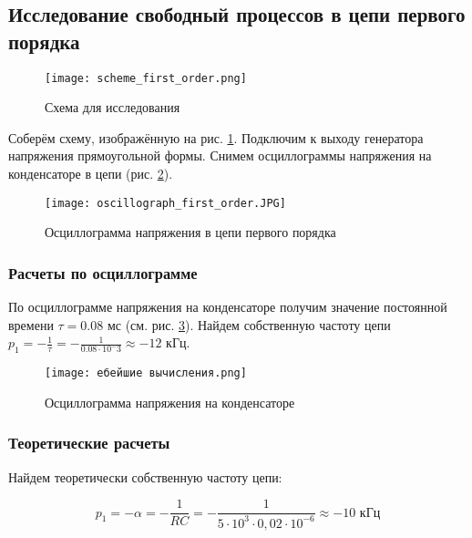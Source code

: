 \subsection{Исследование свободный процессов в цепи первого порядка}

\begin{figure}[!h]
  \centering
  \texttt{[image: scheme\_first\_order.png]}
  \caption{Схема для исследования}
  \label{fig:scheme_first_order}
\end{figure}

Соберём схему, изображённую на рис. \ref*{fig:scheme_first_order}.
Подключим к выходу генератора напряжения прямоугольной формы.
Снимем осциллограммы напряжения на конденсаторе в цепи (рис. \ref*{fig:oscillograph_first_order}).

\begin{figure}[!h]
  \centering
  \texttt{[image: oscillograph\_first\_order.JPG]}
  \caption{Осциллограмма напряжения в цепи первого порядка}
  \label{fig:oscillograph_first_order}

\end{figure}

\subsubsection{Расчеты по осциллограмме}

По осциллограмме напряжения на конденсаторе получим значение постоянной времени $\tau = 0.08$ мс
(см. рис. \ref*{fig:culculations_first_order}).
Найдем собственную частоту цепи $p_1 = -\frac{1}{\tau} = -\frac{1}{0.08 \cdot 10^-3} \approx - 12$ кГц.

\begin{figure}[!h]
  \centering
  \texttt{[image: ебейшие вычисления.png]}
  \caption{Осциллограмма напряжения на конденсаторе}
  \label{fig:culculations_first_order}
\end{figure}

\subsubsection{Теоретические расчеты}

Найдем теоретически собственную частоту цепи:

\begin{equation}
  p_1 = -\alpha = -\frac{1}{RC}
  = -\frac{1}{5 \cdot 10^3 \cdot 0,02 \cdot 10^{-6}} \approx -10 \text{ кГц}
\end{equation}

